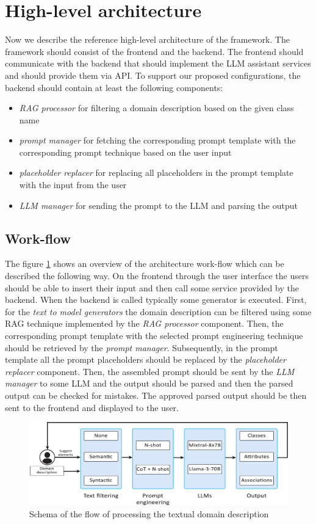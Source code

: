 \section{High-level architecture}
\label{sec:high_level_architecture}

Now we describe the reference high-level architecture of the framework. The framework should consist of the frontend and the backend. The frontend should communicate with the backend that should implement the LLM assistant services and should provide them via API. To support our proposed configurations, the backend should contain at least the following components:

\begin{itemize}
\item \emph{RAG processor} for filtering a domain description based on the given class name
\item \emph{prompt manager} for fetching the corresponding prompt template with the corresponding prompt technique based on the user input
\item \emph{placeholder replacer} for replacing all placeholders in the prompt template with the input from the user
\item \emph{LLM manager} for sending the prompt to the LLM and parsing the output
\end{itemize}


\subsection{Work-flow}

The figure \ref{fig:work-flow} shows an overview of the architecture work-flow which can be described the following way. On the frontend through the user interface the users should be able to insert their input and then call some service provided by the backend. When the backend is called typically some generator is executed. First, for the \emph{text to model generators} the domain description can be filtered using some RAG technique implemented by the \emph{RAG processor} component. Then, the corresponding prompt template with the selected prompt engineering technique should be retrieved by the \emph{prompt manager}. Subsequently, in the prompt template all the prompt placeholders should be replaced by the \emph{placeholder replacer} component. Then, the assembled prompt should be sent by the \emph{LLM manager} to some LLM and the output should be parsed and then the parsed output can be checked for mistakes. The approved parsed output should be then sent to the frontend and displayed to the user.

\begin{figure}[!h]
    \centering
    \includegraphics[scale=0.23]{img/work-flow.jpg}
    \caption{\centering Schema of the flow of processing the textual domain description}
    \label{fig:work-flow}
\end{figure}

